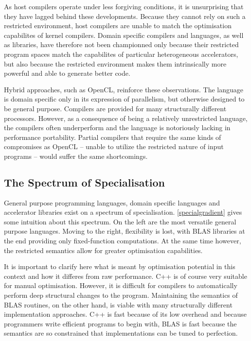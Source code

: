     As host compilers operate under less forgiving conditions, it is
    unsurprising that they have lagged behind these developments.
    Because they cannot rely on such a restricted environment, host compilers
    are unable to match the optimisation capabilites of kernel compilers.
    Domain specific compilers and languages, as well as libraries, have
    therefore not been championned only because their restricted program
    spaces match the capabilites of particular heterogeneous accelerators, but
    also because the restricted environment makes them intrinsically more
    powerful and able to generate better code.

    Hybrid approaches, such as OpenCL, reinforce these observations.
    The language is domain specific only in its expression of parallelism, but
    otherwise designed to be general purpose.
    Compilers are provided for many structurally different processors.
    However, as a consequence of being a relatively unrestricted language, the
    compilers often underperform and the language is notoriously lacking in
    performance portability.
    Partial compilers that require the same kinds of compromises as OpenCL --
    unable to utilize the restricted nature of input programs -- would suffer
    the same shortcomings.

\subsection{The Spectrum of Specialisation}

    General purpose programming languages, domain specific languages and
    accelerator libraries exist on a spectrum of specialisation.
    \autoref{specialgradient} gives some intuition about this spectrum.
    On the left are the most versatile general purpose languages.
    Moving to the right, flexibility is lost, with BLAS libraries at the end
    providing only fixed-function computations.
    At the same time however, the restricted semantics allow for greater 
    optimisation capabilities.

    It is important to clarify here what is meant by optimisation potential in
    this context and how it differes from raw performance.
    C++ is of course very suitable for manual optimisation.
    However, it is difficult for compilers to automatically perform deep
    structural changes to the program.
    Maintaining the semantics of BLAS routines, on the other hand, is viable
    with many structurally different implementation approaches.
    C++ is fast because of its low overhead and because programmers write
    efficient programs to begin with, BLAS is fast because the semantics are so
    constrained that implementations can be tuned to perfection.

